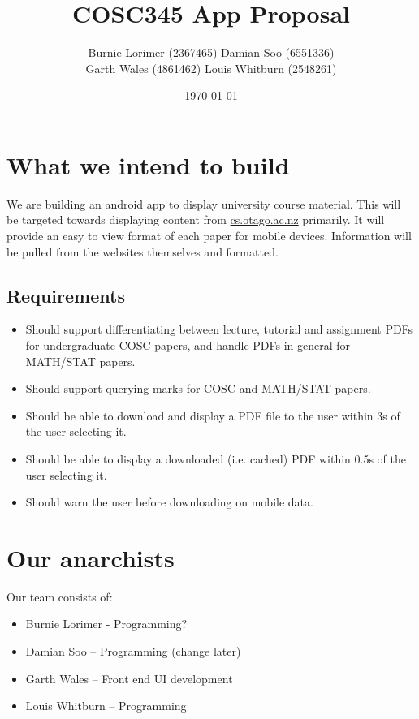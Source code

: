 \documentclass{article}
\title{COSC345 App Proposal}
\author{Burnie Lorimer (2367465) Damian Soo (6551336) \\ Garth Wales (4861462) Louis Whitburn (2548261)}
\date{\today}
\begin{document}
	\maketitle
	
	\section{What we intend to build}
	
	We are building an android app to display university course material. This will be targeted towards displaying content from \url{cs.otago.ac.nz} primarily. It will provide an easy to view format of each paper for mobile devices. Information will be pulled from the websites themselves and formatted.
	
	\subsection{Requirements}
	
	\begin{itemize}
		\item Should support differentiating between lecture, tutorial and assignment PDFs for undergraduate COSC papers, and handle PDFs in general for MATH/STAT papers.
		\item Should support querying marks for COSC and MATH/STAT papers.
		\item Should be able to download and display a PDF file to the user within 3s of the user selecting it.
		\item Should be able to display a downloaded (i.e. cached) PDF within 0.5s of the user selecting it.
		\item Should warn the user before downloading on mobile data.
	\end{itemize}
	
	\section{Our anarchists}
	
	Our team consists of: 
	\begin{itemize}
		\item Burnie Lorimer - Programming?
		\item Damian Soo – Programming (change later)
		\item Garth Wales – Front end UI development
		\item Louis Whitburn – Programming
	\end{itemize}
\end{document}
